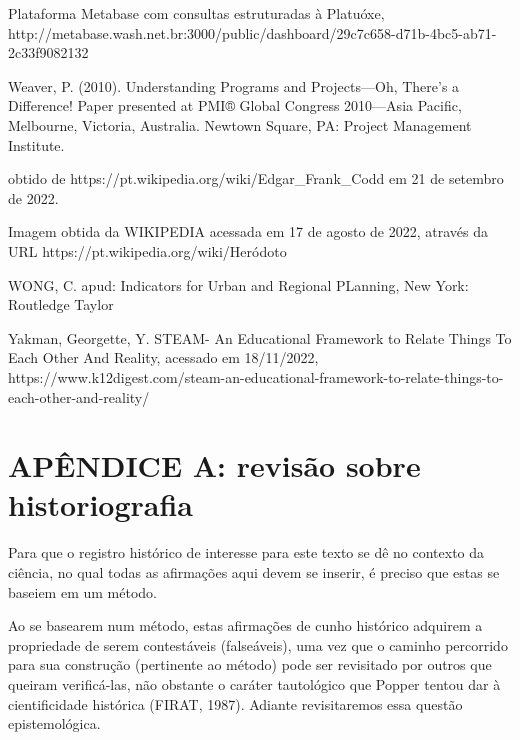 \begin{flushleft}
[WASH, 2023] Plataforma Metabase com consultas estruturadas à Platuóxe, http://metabase.wash.net.br:3000/public/dashboard/29c7c658-d71b-4bc5-ab71-2c33f9082132
\end{flushleft}


\begin{flushleft}
[WEAVER, 2010] Weaver, P. (2010). Understanding Programs and Projects—Oh, There's a Difference! Paper presented at PMI® Global Congress 2010—Asia Pacific, Melbourne, Victoria, Australia. Newtown Square, PA: Project Management Institute.
\end{flushleft}


\begin{flushleft}
 obtido de https://pt.wikipedia.org/wiki/Edgar\_Frank\_Codd em 21 de setembro de 2022.
\end{flushleft}


\begin{flushleft}
[WIKIPEDIA, 2022] Imagem obtida da WIKIPEDIA acessada em 17 de agosto de 2022, através da URL https://pt.wikipedia.org/wiki/Heródoto
\end{flushleft}


\begin{flushleft}
[WONG, 2006] WONG, C. apud: Indicators for Urban and Regional PLanning, New York: Routledge Taylor 
\end{flushleft}


\begin{flushleft}
[YAKMAN, 2019] Yakman, Georgette, Y. STEAM- An Educational Framework to Relate Things To Each Other And Reality, acessado em 18/11/2022, https://www.k12digest.com/steam-an-educational-framework-to-relate-things-to-each-other-and-reality/
\end{flushleft}


\chapter[APÊNDICE A: revisão sobre historiografia]{APÊNDICE A: revisão sobre historiografia}\label{APÊNDICE A: revisão sobre historiografia}
Para que o registro histórico de interesse para este texto se dê no contexto da ciência, no qual todas as afirmações aqui devem se inserir, é preciso que estas se baseiem em um método.

Ao se basearem num método, estas afirmações de cunho histórico adquirem a propriedade de serem contestáveis (falseáveis), uma vez que o caminho percorrido para sua construção (pertinente ao método) pode ser revisitado por outros que queiram verificá-las, não obstante o caráter tautológico que Popper tentou dar à cientificidade histórica  (FIRAT, 1987). Adiante revisitaremos essa questão epistemológica.

